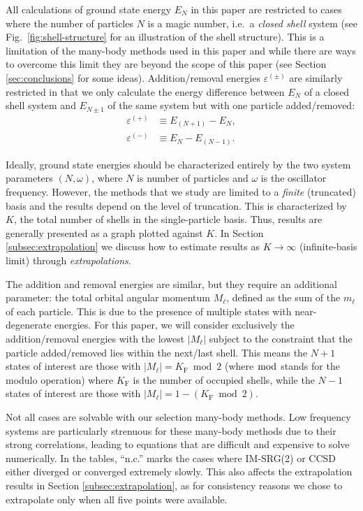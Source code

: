 \documentclass[aip, jcp, 12pt]{revtex4-1}
\begin{document}
All calculations of ground state energy $E_N$ in this paper are restricted to cases where the number of particles $N$ is a magic number, i.e.\ a \textit{closed shell} system (see Fig.\ \ref{fig:shell-structure} for an illustration of the shell structure).  This is a limitation of the many-body methods used in this paper and while there are ways to overcome this limit they are beyond the scope of this paper (see Section \ref{sec:conclusions} for some ideas).  Addition/removal energies $\varepsilon^{(\pm)}$ are similarly restricted in that we only calculate the energy difference between $E_N$ of a closed shell system and $E_{N \pm 1}$ of the same system but with one particle added/removed:
\begin{align*}
  \varepsilon^{(+)} &\equiv E_{(N + 1)} - E_N, \\
  \varepsilon^{(-)} &\equiv E_N - E_{(N - 1)}.
\end{align*}

Ideally, ground state energies should be characterized entirely by the two system parameters $(N, \omega)$, where $N$ is number of particles and $\omega$ is the oscillator frequency.  However, the methods that we study are limited to a \emph{finite} (truncated) basis and the results depend on the level of truncation.  This is characterized by $K$, the total number of shells in the single-particle basis.  Thus, results are generally presented as a graph plotted against $K$.  In Section \ref{subsec:extrapolation} we discuss how to estimate results as $K \to \infty$ (infinite-basis limit) through \textit{extrapolations}.

The addition and removal energies are similar, but they require an additional parameter: the total orbital angular momentum $M_\ell$, defined as the sum of the $m_\ell$ of each particle.  This is due to the presence of multiple states with near-degenerate energies.  For this paper, we will consider exclusively the addition/removal energies with the lowest $|M_\ell|$ subject to the constraint that the particle added/removed lies within the next/last shell.  This means the $N + 1$ states of interest are those with $|M_\ell| = K_{\mathrm{F}} \bmod 2$ (where $\bmod$ stands for the modulo operation) where $K_{\mathrm{F}}$ is the number of occupied shells, while the $N - 1$ states of interest are those with $|M_\ell| = 1 - (K_{\mathrm{F}} \bmod 2)$.

Not all cases are solvable with our selection many-body methods.  Low frequency systems are particularly strenuous for these many-body methods due to their strong correlations, leading to equations that are difficult and expensive to solve numerically.  In the tables, ``n.c.'' marks the cases where IM-SRG(2) or CCSD either diverged or converged extremely slowly.  This also affects the extrapolation results in Section \ref{subsec:extrapolation}, as for consistency reasons we chose to extrapolate only when all five points were available.
\end{document}
